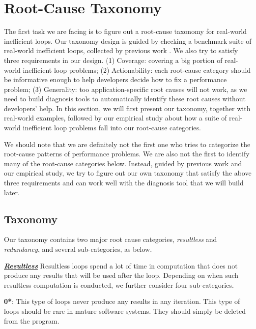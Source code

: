 \section{Root-Cause Taxonomy}
\label{sec:study}

The first task we are facing is to figure out a root-cause taxonomy for
real-world inefficient loops. 
Our taxonomy design is guided by checking a benchmark suite of real-world
inefficient loops, collected by previous work \cite{SongOOPSLA2014,PerfBug}. 
We also try to satisfy three requirements in our design.
(1) Coverage: covering
a big portion of real-world inefficient loop problems; 
(2) Actionability: each root-cause category should be informative enough 
to help developers
decide how to fix a performance problem; 
(3) Generality: too application-specific root causes will not work, as we
need to build diagnosis tools to automatically identify these root causes 
without developers' help.
In this section, we will first present our taxonomy, together with real-world
examples, followed by our empirical study about how a suite of real-world 
inefficient
loop problems fall into our root-cause categories.

We should note that we are definitely not the first one who tries to categorize
the root-cause patterns of performance problems. We are also not the first
to identify many of the root-cause categories below. Instead, guided by
previous work and our empirical study, we try to figure out our own taxonomy 
that satisfy the above three requirements and can
work well with the diagnosis tool that we will build later.

\subsection{Taxonomy}
\label{sec:study_tax}
Our taxonomy contains two major root cause categories,
\textit{resultless} and \textit{redundancy}, and several sub-categories, 
as below.

\underline{\textit{\textbf{Resultless}}}
Resultless loops spend a lot of time in computation that does not 
produce any results that will be used after the loop.
Depending on when such resultless computation is conducted, we further
consider four sub-categories.

{\textbf{0*}}: 
This type of loops never produce any results in any iteration.
This type of loops should be rare in mature software systems.
They should simply be deleted from the program.

